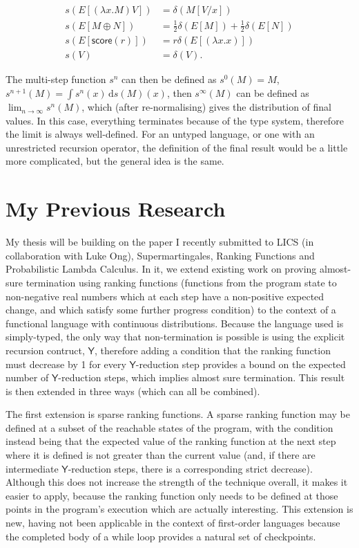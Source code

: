\documentclass[titlepage]{article}
\newcommand{\tY}{\mathsf{Y}}
\newcommand{\tscore}{\mathsf{score}}
\begin{document}
\begin{align*}
s(E[(\lambda x. M) V]) & = \delta(M[V/x]) \\
s(E[M \oplus N]) & = \frac 1 2 \delta(E[M]) + \frac 1 2 \delta(E[N]) \\
s(E[\tscore(r)]) & = r \delta(E[(\lambda x. x)]) \\
s(V) & = \delta(V).
\end{align*}

The multi-step function $s^n$ can then be defined as $s^0(M) = M$, $s^{n+1}(M) = \int s^n(x)\,\mathrm d s(M)(x)$, then $s^\infty(M)$ can be defined as $\lim_{n \to \infty} s^n(M)$, which (after re-normalising) gives the distribution of final values. In this case, everything terminates because of the type system, therefore the limit is always well-defined. For an untyped language, or one with an unrestricted recursion operator, the definition of the final result would be a little more complicated, but the general idea is the same.


\section{My Previous Research}
My thesis will be building on the paper I recently submitted to LICS (in collaboration with Luke Ong), Supermartingales, Ranking Functions and Probabilistic Lambda Calculus. In it, we extend existing work on proving almost-sure termination using ranking functions (functions from the program state to non-negative real numbers which at each step have a non-positive expected change, and which satisfy some further progress condition) to the context of a functional language with continuous distributions. Because the language used is simply-typed, the only way that non-termination is possible is using the explicit recursion contruct, $\tY$, therefore adding a condition that the ranking function must decrease by 1 for every $\tY$-reduction step provides a bound on the expected number of $\tY$-reduction steps, which implies almost sure termination. This result is then extended in three ways (which can all be combined).

The first extension is sparse ranking functions. A sparse ranking function may be defined at a subset of the reachable states of the program, with the condition instead being that the expected value of the ranking function at the next step where it is defined is not greater than the current value (and, if there are intermediate $\tY$-reduction steps, there is a corresponding strict decrease). Although this does not increase the strength of the technique overall, it makes it easier to apply, because the ranking function only needs to be defined at those points in the program's execution which are actually interesting. This extension is new, having not been applicable in the context of first-order languages because the completed body of a while loop provides a natural set of checkpoints.
\end{document}
